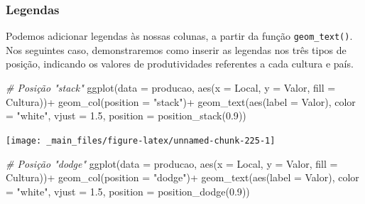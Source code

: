 \documentclass[
  brazilian,
]{book}
\newenvironment{Shaded}{\begin{snugshade}}{\end{snugshade}}
\newcommand{\AttributeTok}[1]{\textcolor[rgb]{0.77,0.63,0.00}{#1}}
\newcommand{\CommentTok}[1]{\textcolor[rgb]{0.56,0.35,0.01}{\textit{#1}}}
\newcommand{\FloatTok}[1]{\textcolor[rgb]{0.00,0.00,0.81}{#1}}
\newcommand{\FunctionTok}[1]{\textcolor[rgb]{0.00,0.00,0.00}{#1}}
\newcommand{\NormalTok}[1]{#1}
\newcommand{\SpecialCharTok}[1]{\textcolor[rgb]{0.00,0.00,0.00}{#1}}
\newcommand{\StringTok}[1]{\textcolor[rgb]{0.31,0.60,0.02}{#1}}
\begin{document}
\hypertarget{legendas}{%
\subsubsection{Legendas}\label{legendas}}

Podemos adicionar legendas às nossas colunas, a partir da função \texttt{geom\_text()}. Nos seguintes caso, demonstraremos como inserir as legendas nos três tipos de posição, indicando os valores de produtividades referentes a cada cultura e país.

\begin{Shaded}
\begin{Highlighting}[]
\CommentTok{\# Posição "stack"}
\FunctionTok{ggplot}\NormalTok{(}\AttributeTok{data =}\NormalTok{ producao,}
       \FunctionTok{aes}\NormalTok{(}\AttributeTok{x =}\NormalTok{ Local,}
           \AttributeTok{y =}\NormalTok{ Valor,}
           \AttributeTok{fill =}\NormalTok{ Cultura))}\SpecialCharTok{+}
  \FunctionTok{geom\_col}\NormalTok{(}\AttributeTok{position =} \StringTok{"stack"}\NormalTok{)}\SpecialCharTok{+}
  \FunctionTok{geom\_text}\NormalTok{(}\FunctionTok{aes}\NormalTok{(}\AttributeTok{label =}\NormalTok{ Valor),}
           \AttributeTok{color =} \StringTok{"white"}\NormalTok{,}
           \AttributeTok{vjust =} \FloatTok{1.5}\NormalTok{,}
           \AttributeTok{position =} \FunctionTok{position\_stack}\NormalTok{(}\FloatTok{0.9}\NormalTok{))}
\end{Highlighting}
\end{Shaded}

\begin{center}\texttt{[image: \_main\_files/figure-latex/unnamed-chunk-225-1]} \end{center}

\begin{Shaded}
\begin{Highlighting}[]
\CommentTok{\# Posição "dodge"}
\FunctionTok{ggplot}\NormalTok{(}\AttributeTok{data =}\NormalTok{ producao,}
       \FunctionTok{aes}\NormalTok{(}\AttributeTok{x =}\NormalTok{ Local,}
           \AttributeTok{y =}\NormalTok{ Valor,}
           \AttributeTok{fill =}\NormalTok{ Cultura))}\SpecialCharTok{+}
  \FunctionTok{geom\_col}\NormalTok{(}\AttributeTok{position =} \StringTok{"dodge"}\NormalTok{)}\SpecialCharTok{+}
  \FunctionTok{geom\_text}\NormalTok{(}\FunctionTok{aes}\NormalTok{(}\AttributeTok{label =}\NormalTok{ Valor),}
            \AttributeTok{color =} \StringTok{"white"}\NormalTok{,}
            \AttributeTok{vjust =} \FloatTok{1.5}\NormalTok{,}
            \AttributeTok{position =} \FunctionTok{position\_dodge}\NormalTok{(}\FloatTok{0.9}\NormalTok{))}
\end{Highlighting}
\end{Shaded}
\end{document}
